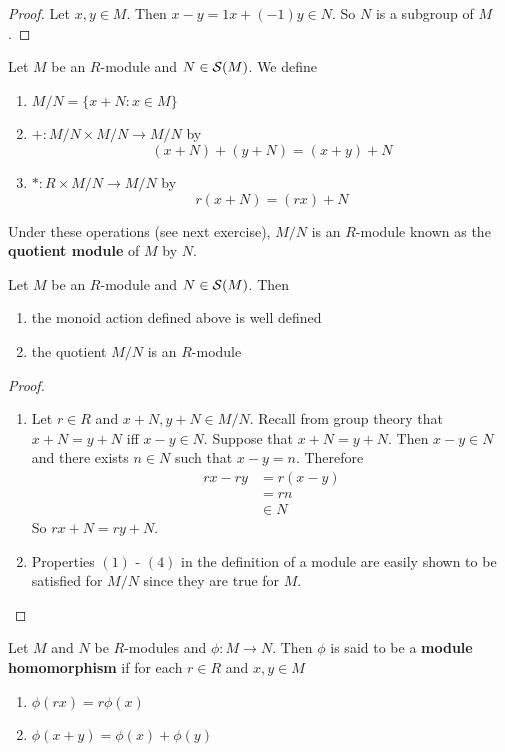 \documentclass{book}
\begin{document}
	\begin{proof}
		Let $x,y \in M$. Then $x-y = 1x + (-1)y \in N$. So $N$ is a subgroup of $M$.
	\end{proof}
	
	\begin{defn}
		Let $M$ be an $R$-module and $N \in \mathcal{S}(M)$. We define  
		\begin{enumerate}
			\item $M/N = \{x + N: x \in M\}$ 
			\item $+: M/N \times M/N \rightarrow M/N$ by $$(x+N) + (y+N) = (x+y) + N$$
			\item $*: R \times M/N \rightarrow M/N$ by $$r(x+N) = (rx) + N$$
		\end{enumerate}
		Under these operations (see next exercise), $M/N$ is an $R$-module known as the \textbf{quotient module} of $M$ by $N$.
	\end{defn}	
	
	\begin{ex} 
		Let $M$ be an $R$-module and $N \in \mathcal{S}(M)$. Then
		\begin{enumerate}
			\item the monoid action defined above is well defined
			\item the quotient $M/N$ is an $R$-module
		\end{enumerate}
	\end{ex}
	
	\begin{proof}\
		\begin{enumerate}
			\item Let $r \in R$ and $x +N, y +N \in M/N $. Recall from group theory that $x + N = y + N$ iff $x-y \in N$. Suppose that $x + N = y + N$. Then $x - y \in N$ and there exists $n \in N$ such that $x-y = n$. Therefore
			\begin{align*}
				rx - ry 
				&= r(x-y) \\
				&= rn \\
				&\in N
			\end{align*}
			So $rx + N = ry + N$.
			\item Properties $(1)$ - $(4)$ in the definition of a module are easily shown to be satisfied for $M/N$ since they are true for $M$.
		\end{enumerate}
	\end{proof}
	
	\begin{defn}
		Let $M$ and $N$ be $R$-modules and $\phi:M \rightarrow N$. Then $\phi$ is said to be a \textbf{module homomorphism} if for each $r \in R$ and $x,y \in M$
		\begin{enumerate}
			\item $\phi(rx) = r\phi(x)$
			\item $\phi(x+y) = \phi(x) + \phi(y)$
		\end{enumerate}
	\end{defn}	
	
\end{document}
